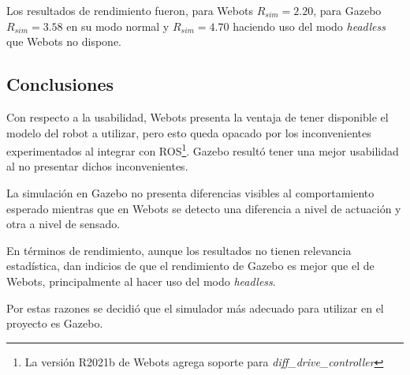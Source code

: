 Los resultados de rendimiento fueron, para Webots $R_{sim}=2.20$, para Gazebo $R_{sim}=3.58$
en su modo normal y $R_{sim}=4.70$ haciendo uso del modo \emph{headless} que Webots no dispone.

\subsection{Conclusiones}

Con respecto a la usabilidad, Webots presenta la ventaja de tener
disponible el modelo del robot a utilizar, pero esto queda opacado por los inconvenientes
experimentados al integrar con \gls{ROS}\footnote{La versión R2021b de
Webots agrega soporte para \emph{diff\_drive\_controller}}. Gazebo resultó tener una mejor usabilidad al no presentar dichos
inconvenientes.

La simulación en Gazebo no presenta diferencias visibles al comportamiento
esperado mientras que en Webots se detecto una diferencia a nivel de actuación
y otra a nivel de sensado.

En términos de rendimiento, aunque los resultados no tienen relevancia estadística,
dan indicios de que el rendimiento de Gazebo es mejor que el de Webots,
principalmente al hacer uso del modo \emph{headless}.

Por estas razones se decidió que el simulador más adecuado para utilizar en el
proyecto es Gazebo.
